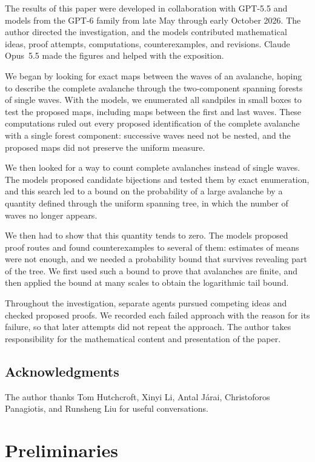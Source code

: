 \documentclass[11pt]{amsart}
\numberwithin{equation}{section}
\begin{document}
The results of this paper were developed in collaboration with GPT-5.5 and models from the GPT-6 family from late May through early October 2026. The author directed the investigation, and the models contributed mathematical ideas, proof attempts, computations, counterexamples, and revisions. Claude Opus~5.5 made the figures and helped with the exposition.

We began by looking for exact maps between the waves of an avalanche, hoping to describe the complete avalanche through the two-component spanning forests of single waves. With the models, we enumerated all sandpiles in small boxes to test the proposed maps, including maps between the first and last waves. These computations ruled out every proposed identification of the complete avalanche with a single forest component: successive waves need not be nested, and the proposed maps did not preserve the uniform measure.

We then looked for a way to count complete avalanches instead of single waves. The models proposed candidate bijections and tested them by exact enumeration, and this search led to a bound on the probability of a large avalanche by a quantity defined through the uniform spanning tree, in which the number of waves no longer appears.

We then had to show that this quantity tends to zero. The models proposed proof routes and found counterexamples to several of them: estimates of means were not enough, and we needed a probability bound that survives revealing part of the tree. We first used such a bound to prove that avalanches are finite, and then applied the bound at many scales to obtain the logarithmic tail bound.

Throughout the investigation, separate agents pursued competing ideas and checked proposed proofs. We recorded each failed approach with the reason for its failure, so that later attempts did not repeat the approach. The author takes responsibility for the mathematical content and presentation of the paper.

\subsection*{Acknowledgments}

The author thanks Tom Hutchcroft, Xinyi Li, Antal J\'arai, Christoforos Panagiotis, and Runsheng Liu for useful conversations.

\section{Preliminaries}\label{sec:prelim}
\end{document}
